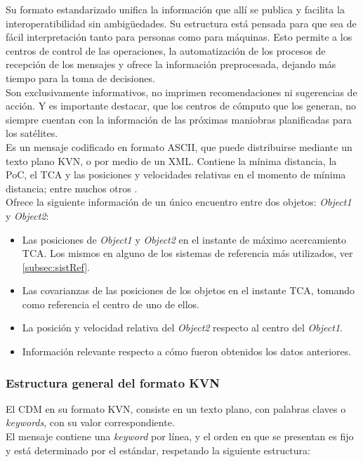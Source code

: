 {Su formato estandarizado unifica la informaci\'on que all\'i se publica y facilita la interoperatibilidad sin ambig\"{u}edades. Su estructura est\'a pensada para que sea de f\'acil interpretaci\'on tanto para personas como para m\'aquinas. Esto permite a los centros de control de las operaciones, la automatizaci\'on de los procesos de recepci\'on de los mensajes y ofrece la informaci\'on preprocesada, dejando m\'as tiempo para la toma de decisiones.\\

Son exclusivamente informativos, no imprimen recomendaciones ni sugerencias de acci\'on.
Y es importante destacar, que los centros de c\'omputo que los generan, no siempre cuentan con la informaci\'on de las pr\'oximas maniobras planificadas para los sat\'elites.\\

Es un mensaje codificado en formato ASCII, que puede distribuirse mediante un texto plano \ac{KVN}, o por medio de un \ac{XML}. Contiene la m\'inima distancia, la PoC, el TCA y las posiciones y velocidades relativas en el momento de m\'inima distancia; entre muchos otros \citep{CDM}.\\

Ofrece la siguiente informaci\'on de un \'unico encuentro entre dos objetos: {\it{Object1}} y {\it{Object2}}:
\begin{itemize}
\item Las posiciones de  {\it{Object1}} y  {\it{Object2}} en el instante de m\'aximo acercamiento TCA. Los mismos en alguno de los sistemas de referencia m\'as utilizados, ver \ref{subsec:sistRef}.
\item Las covarianzas de las posiciones de los objetos en el instante TCA, tomando como referencia el centro de uno de ellos.
\item La posici\'on y velocidad relativa del {\it{Object2}} respecto al centro del {\it{Object1}}.
\item Informaci\'on relevante respecto a c\'omo fueron obtenidos los datos anteriores.
\end{itemize}


\subsubsection*{Estructura general del formato KVN}
El CDM en su formato KVN, consiste en un texto plano, con palabras claves o {\it{keywords}}, con su valor correspondiente.\\
El mensaje contiene una {\it{keyword}} por l\'inea, y el orden en que se presentan es fijo y est\'a determinado por el est\'andar, respetando la siguiente estructura:

}
